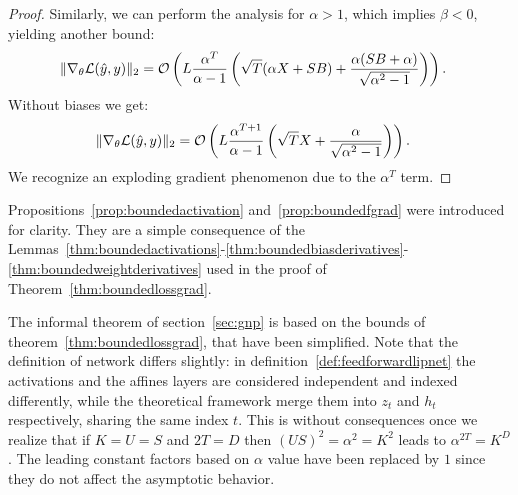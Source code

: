 \begin{proof}
    Similarly, we can perform the analysis for $\alpha>1$, which implies $\beta<0$, yielding another bound:
    \begin{align}
        \|\nabla_{\theta}\mathcal{L}(\hat y,y)\|_2 &=\mathcal{O}\left(L\frac{\alpha^T}{\alpha-1}\left(\sqrt{T}(\alpha X+SB)+\frac{\alpha(SB+\alpha)}{\sqrt{\alpha^2-1}}\right)\right).
    \end{align}
    Without biases we get:
    \begin{align}
        \|\nabla_{\theta}\mathcal{L}(\hat y,y)\|_2 &=\mathcal{O}\left(L\frac{\alpha^{T+1}}{\alpha-1}\left(\sqrt{T} X+\frac{\alpha}{\sqrt{\alpha^2-1}}\right)\right).
    \end{align}
    We recognize an exploding gradient phenomenon due to the $\alpha^T$ term.
    \end{proof}

    Propositions~\ref{prop:boundedactivation} and~\ref{prop:boundedfgrad} were introduced for clarity. They are a simple consequence of the Lemmas~\ref{thm:boundedactivations}-\ref{thm:boundedbiasderivatives}-\ref{thm:boundedweightderivatives} used in the proof of Theorem~\ref{thm:boundedlossgrad}.


    The informal theorem of section~\ref{sec:gnp} is based on the bounds of theorem~\ref{thm:boundedlossgrad}, that have been simplified. Note that the definition of network differs slightly: in definition~\ref{def:feedforwardlipnet} the activations and the affines layers are considered independent and indexed differently, while the theoretical framework merge them into $z_t$ and $h_t$ respectively, sharing the same index $t$. This is without consequences once we realize that if $K=U=S$ and $2T=D$ then $(US)^2= \alpha^2=K^2$ leads to $\alpha^{2T}=K^D$. The leading constant factors based on $\alpha$ value have been replaced by $1$ since they do not affect the asymptotic behavior.  



